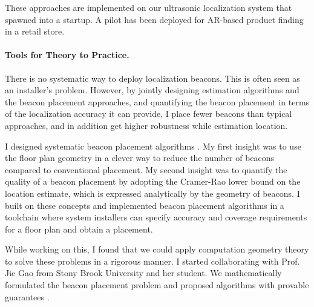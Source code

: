 \documentclass[10pt]{article}
\begin{document}
These approaches are implemented on our ultrasonic localization system that spawned into a startup. A pilot has been deployed for AR-based product finding in a retail store. 




\paragraph{Tools for Theory to Practice.  }
There is no systematic way to deploy localization beacons. This is often seen as an installer's problem. 
However, by jointly designing estimation algorithms and the beacon placement approaches, and quantifying the beacon placement in terms of the localization accuracy it can provide, I place fewer beacons than typical approaches, and in addition get higher robustness while estimation location.

I designed systematic beacon placement algorithms \cite{rajagopal2016beacon}. 
My first insight was to use the floor plan geometry in a clever way to reduce the number of beacons compared to conventional placement. 
My second insight was to quantify the quality of a beacon placement by adopting the Cramer-Rao lower bound on the location estimate, which is expressed analytically by the geometry of beacons. I built on these concepts and implemented beacon placement algorithms in a toolchain where system installers can specify accuracy and coverage requirements for a floor plan and obtain a placement. 

While working on this, I found that we could apply computation geometry theory to solve these problems in a rigorous manner.  
I started collaborating with Prof. Jie Gao from Stony Brook University and her student. 
We mathematically formulated the beacon placement problem and proposed algorithms with provable guarantees \cite{beaconplacementtheory}.  
\end{document}
